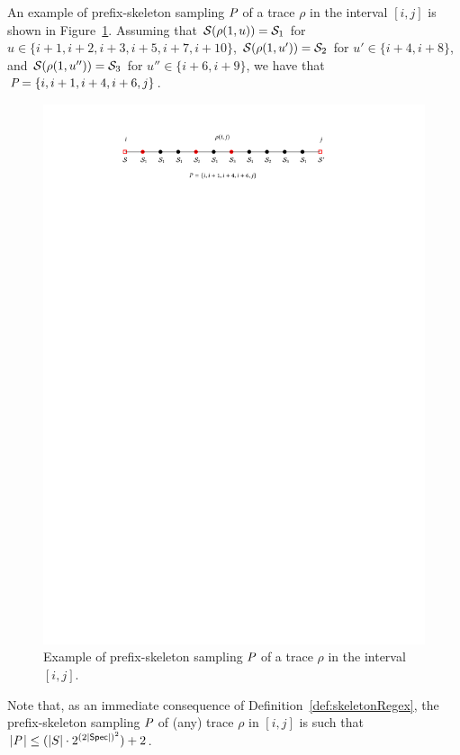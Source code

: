 \begin{example}
An example of prefix-skeleton sampling $\textit{P}$ of a trace $\rho$ in the interval $[i,j]$ is shown in  Figure~\ref{fig:prefsk}. Assuming that $\mathcal{S}(\rho(1,u))=\mathcal{S}_1$ for $u\in\{i+1,i+2,i+3,i+5,i+7,i+10\}$, $\mathcal{S}(\rho(1,u'))=\mathcal{S}_2$ for $u'\in\{i+4,i+8\}$, and $\mathcal{S}(\rho(1,u''))=\mathcal{S}_3$ for $u''\in\{i+6,i+9\}$, we have that $\textit{P}= \{i, i+1, i+4,i+6,j\}$.

\begin{figure}[H]
    \centering
    \includegraphics[width=\linewidth]{Chaps/Gandalf17RIVISTA/prefsampl.pdf}
    \caption{Example of prefix-skeleton sampling $\textit{P}$ of a trace $\rho$ in the interval $[i,j]$. }
    \label{fig:prefsk}
\end{figure}
\end{example}

Note that, as an immediate consequence of Definition~\ref{def:skeletonRegex}, the prefix-skeleton sampling $\textit{P}$  of (any) trace $\rho$ in $[i,j]$ is such that $|\textit{P}\,|\leq (|S|\cdot 2^{(2|\textsf{Spec}|)^2})+2$. %

